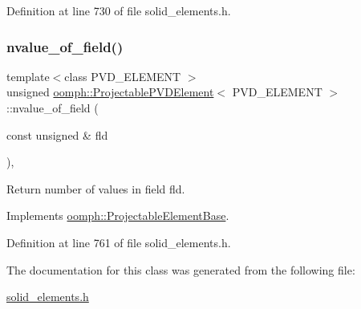 Definition at line 730 of file solid\+\_\+elements.\+h.

\mbox{\label{classoomph_1_1ProjectablePVDElement_a07fd8297f68847c095aff3f97fa4d91e}} 
\subsubsection{\texorpdfstring{nvalue\+\_\+of\+\_\+field()}{nvalue\_of\_field()}}
{\footnotesize\ttfamily template$<$class P\+V\+D\+\_\+\+E\+L\+E\+M\+E\+NT $>$ \\
unsigned \hyperlink{classoomph_1_1ProjectablePVDElement}{oomph\+::\+Projectable\+P\+V\+D\+Element}$<$ P\+V\+D\+\_\+\+E\+L\+E\+M\+E\+NT $>$\+::nvalue\+\_\+of\+\_\+field (\begin{DoxyParamCaption}\item[{const unsigned \&}]{fld }\end{DoxyParamCaption})\hspace{0.3cm}{\ttfamily [inline]}, {\ttfamily [virtual]}}



Return number of values in field fld. 



Implements \hyperlink{classoomph_1_1ProjectableElementBase_a1a9a6de16f3511bca8e8be770abb9c2e}{oomph\+::\+Projectable\+Element\+Base}.



Definition at line 761 of file solid\+\_\+elements.\+h.



The documentation for this class was generated from the following file\+:\begin{DoxyCompactItemize}
\item 
\hyperlink{solid__elements_8h}{solid\+\_\+elements.\+h}\end{DoxyCompactItemize}

